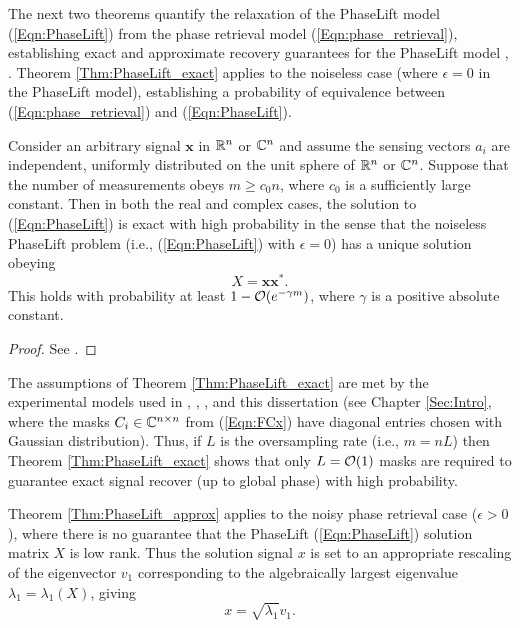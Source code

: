 The next two theorems quantify the relaxation of the PhaseLift model (\ref{Eqn:PhaseLift}) from the phase retrieval model (\ref{Eqn:phase_retrieval}), establishing exact and approximate recovery guarantees for the PhaseLift model \cite{candes2014solving}, \cite{candes2013phaselift}.  Theorem \ref{Thm:PhaseLift_exact} applies to the noiseless case (where $\epsilon = 0$ in the PhaseLift model), establishing a probability of equivalence between (\ref{Eqn:phase_retrieval}) and (\ref{Eqn:PhaseLift}).  


\begin{theorem}  \label{Thm:PhaseLift_exact}
Consider an arbitrary signal $\mathbf{x}$ in ${\mathbb R}^n$ or ${\mathbb C}^n$ and assume the sensing vectors $a_i$ are independent, uniformly distributed on the unit sphere of ${\mathbb R}^n$ or ${\mathbb C}^n$.  Suppose that the number of measurements obeys $m \geq c_0 n$, where $c_0$ is a sufficiently large constant. Then in both the real and complex cases, the solution to (\ref{Eqn:PhaseLift}) is exact with high probability in the sense that the noiseless PhaseLift problem (i.e., (\ref{Eqn:PhaseLift}) with $\epsilon = 0$) has a unique solution obeying
\[
X = \mathbf{x}\mathbf{x}^*.
\]
This holds with probability at least $1 - {\mathcal O}(e^{-\gamma m})$, where $\gamma$ is a positive absolute constant.
\end{theorem}
\begin{proof}
See \cite[Section 2]{candes2014solving}.
\end{proof}




The assumptions of Theorem \ref{Thm:PhaseLift_exact} are met by the experimental models used in \cite{DBLP:journals/siamis/CandesESV13}, \cite{candes2013phaselift}, \cite{DBLP:journals/siamsc/FriedlanderM16}, and this dissertation (see Chapter \ref{Sec:Intro}, where the masks $C_i \in {\mathbb C}^{n \times n}$ from (\ref{Eqn:FCx}) have diagonal entries chosen with Gaussian distribution).  Thus, if $L$ is the oversampling rate (i.e., $m = nL$) then Theorem \ref{Thm:PhaseLift_exact} shows that only $L = {\mathcal O}(1)$ masks are required to guarantee exact signal recover (up to global phase) with high probability.




Theorem \ref{Thm:PhaseLift_approx} applies to the  noisy phase retrieval case ($\epsilon > 0$), where there is no guarantee that the PhaseLift (\ref{Eqn:PhaseLift}) solution matrix $X$ is low rank.  Thus the solution signal $x$ is set to an appropriate rescaling of the eigenvector $v_1$ corresponding to the algebraically largest eigenvalue $\lambda_1 = \lambda_1 (X)$, giving
\begin{equation}  			\label{Eqn:PhaseLift_solution_signal}
x = \sqrt{\lambda_1}v_1.
\end{equation}

